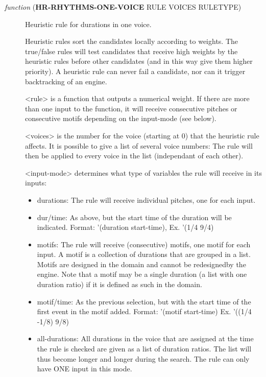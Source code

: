 \begin{description}
\item[{ \emph{function} (\textbf{HR-RHYTHMS-ONE-VOICE} RULE VOICES RULETYPE)}] Heuristic rule for durations in one voice.

Heuristic rules sort the candidates locally according to weights. 
The true/false rules will test candidates that receive high weights by
the heuristic rules before other candidates (and in this way give them
higher priority). A heuristic rule can never fail a candidate, nor 
can it trigger backtracking of an engine. 

<rule> is a function that outputs a numerical weight. If there are 
more than one input to the function, it will receive consecutive 
pitches or consecutive motifs depending on the input-mode (see below). 

<voices> is the number for the voice (starting at 0) that the heuristic 
rule affects. It is possible to give a list of several voice numbers: 
The rule will then be applied to every voice in the list (independant 
of each other).

<input-mode> determines what type of variables the rule will receive in 
its inputs:
\begin{itemize}
\item durations: The rule will receive individual  pitches, one for each input.
\item dur/time: As above, but the start time of the duration will be indicated.
Format: '(duration start-time), Ex. '(1/4 9/4)
\item motifs: The rule will receive (consecutive) motifs, one motif for each 
input. A motif is a collection of durations that are grouped in 
a list. Motifs are designed in the domain and cannot be 
redesignedby the engine. Note that a motif may be a single 
duration (a list with one duration ratio) if it is defined as 
such in the domain.
\item motif/time: As the previous selection, but with the start time of the 
first event in the motif added. Format: '(motif start-time)
Ex. '((1/4 -1/8) 9/8)
\item all-durations: All durations in the voice that are assigned at the time 
the rule is checked are given as a list of duration ratios.  
The list will thus become longer and longer during the 
search. The rule can only have ONE input in this mode.
\end{itemize}
\end{description}



